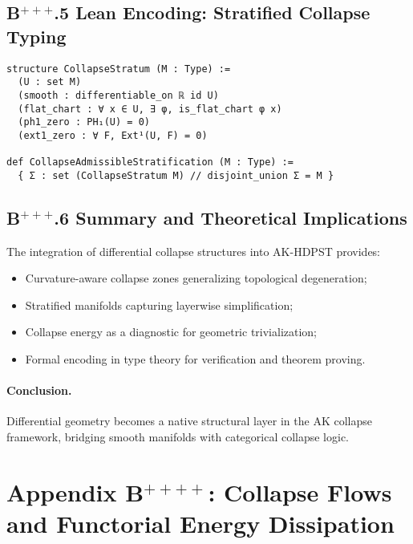 \documentclass[11pt]{article}
\begin{document}
\subsection*{B$^{+++}$.5 Lean Encoding: Stratified Collapse Typing}

\begin{lstlisting}[language=Lean, caption={Stratified Collapse Structures in Lean}]
structure CollapseStratum (M : Type) :=
  (U : set M)
  (smooth : differentiable_on ℝ id U)
  (flat_chart : ∀ x ∈ U, ∃ φ, is_flat_chart φ x)
  (ph1_zero : PH₁(U) = 0)
  (ext1_zero : ∀ F, Ext¹(U, F) = 0)

def CollapseAdmissibleStratification (M : Type) :=
  { Σ : set (CollapseStratum M) // disjoint_union Σ = M }
\end{lstlisting}

\subsection*{B$^{+++}$.6 Summary and Theoretical Implications}

The integration of differential collapse structures into AK-HDPST provides:

\begin{itemize}
  \item Curvature-aware collapse zones generalizing topological degeneration;
  \item Stratified manifolds capturing layerwise simplification;
  \item Collapse energy as a diagnostic for geometric trivialization;
  \item Formal encoding in type theory for verification and theorem proving.
\end{itemize}

\paragraph{Conclusion.} Differential geometry becomes a native structural layer in the AK collapse framework, bridging smooth manifolds with categorical collapse logic.




\section*{Appendix B$^{++++}$: Collapse Flows and Functorial Energy Dissipation}
\end{document}
